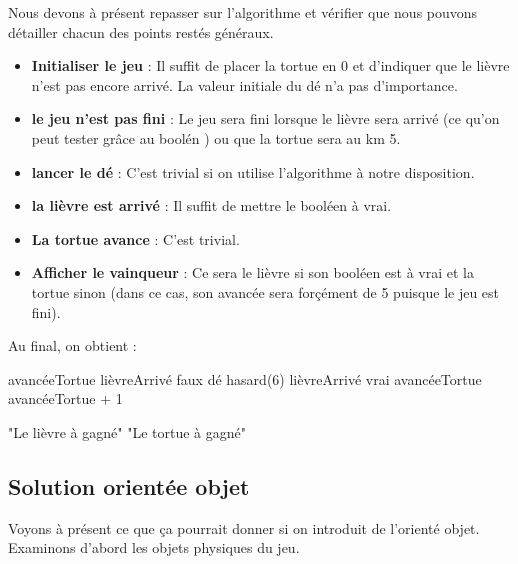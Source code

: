 			Nous devons à présent repasser sur l'algorithme
			et vérifier que nous pouvons détailler 
			chacun des points restés généraux.
			\begin{itemize}
			\item \textbf{Initialiser le jeu} :
				Il suffit de placer la tortue en 0
				et d'indiquer que le lièvre n'est pas encore arrivé.
				La valeur initiale du dé n'a pas d'importance.
			\item \textbf{le jeu n'est pas fini} :
				Le jeu sera fini lorsque le lièvre sera arrivé
				(ce qu'on peut tester grâce au boolén )
				ou que la tortue sera au km 5.
			\item \textbf{lancer le dé} :
				C'est trivial si on utilise l'algorithme 
				à notre disposition.
			\item \textbf{la lièvre est arrivé} :
				Il suffit de mettre le booléen  à vrai.
			\item \textbf{La tortue avance} : 
				C'est trivial.
			\item \textbf{Afficher le vainqueur} :
				Ce sera le lièvre si son booléen est à vrai et la tortue sinon
				(dans ce cas, son avancée sera forçément de 5 puisque le jeu est fini).
			\end{itemize}
			
			Au final, on obtient :
			\begin{LDA}

					\Empty
					\Let avancéeTortue 
					\Let lièvreArrivé \Gets faux
						\Let dé \Gets hasard(6)
							\Let lièvreArrivé \Gets vrai
						\Else
							\Let avancéeTortue \Gets avancéeTortue + 1
						\EndIf
					\EndWhile

					\Empty
						\Write "Le lièvre à gagné"
					\Else
						\Write "Le tortue à gagné"
					\EndIf
				\EndAlgo
			\end{LDA}

	\subsection{Solution orientée objet}
		
		Voyons à présent ce que ça pourrait donner si on introduit
		de l'orienté objet.
		Examinons d'abord les objets physiques du jeu.
		

